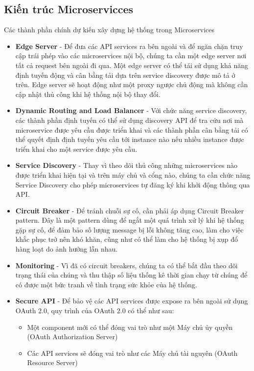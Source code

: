 		\subsection{Kiến trúc Microservicces}
		Các thành phần chính dự kiến xây dựng hệ thống trong Microservices
		\begin{itemize}
		    \item \textbf{Edge Server} - Để đưa các API services ra bên ngoài và để ngăn chặn truy cập trái phép vào các microservices nội bộ, chúng ta cần một edge server nơi tất cả request bên ngoài đi qua. Một edge server có thể tái sử dụng khả năng định tuyến động và cân bằng tải dựa trên service discovery được mô tả ở trên. Edge server sẽ hoạt động như một proxy ngược chủ động mà không cần cập nhật thủ công khi hệ thống nội bộ thay đổi.
		    \item \textbf{Dynamic Routing and Load Balancer} - Với chức năng service discovery, các thành phần định tuyến có thể sử dụng discovery API để tra cứu nơi mà microservice được yêu cầu được triển khai và các thành phần cân bằng tải có thể quyết định định tuyến yêu cầu tới instance nào nếu nhiều instance được triển khai cho một service được yêu cầu.
		    \item \textbf{Service Discovery} - Thay vì theo dõi thủ công những microservices nào được triển khai hiện tại và trên máy chủ và cổng nào, chúng ta cần chức năng Service Discovery cho phép microservices tự đăng ký khi khởi động thông qua API.
		    \item \textbf{Circuit Breaker} - Để tránh chuỗi sự cố, cần phải áp dụng Circuit Breaker pattern. Đây là một pattern dùng để ngắt một quá trình xử lý khi hệ thống gặp sự cố, để đảm bảo số lượng message bị lỗi không tăng cao, làm cho việc khắc phục trở nên khó khăn, cũng như có thể làm cho hệ thống bị xụp đổ hàng loạt do ảnh hưởng lẫn nhau.
		    \item \textbf{Monitoring} - Vì đã có circuit breakers, chúng ta có thể bắt đầu theo dõi trạng thái của chúng và thu thập số liệu thống kê thời gian chạy từ chúng để có được một bức tranh về tình trạng sức khỏe của hệ thống.
	        \item \textbf{Secure API} - Để bảo vệ các API services được expose ra bên ngoài sử dụng OAuth 2.0, quy trình của OAuth 2.0 có thể như sau:
	        \begin{itemize}
	            \item Một component mới có thể đóng vai trò như một Máy chủ ủy quyền (OAuth Authorization Server)
	            \item Các API services sẽ đóng vai trò như các Máy chủ tài nguyên (OAuth Resource Server)

\end{itemize}
\end{itemize}
